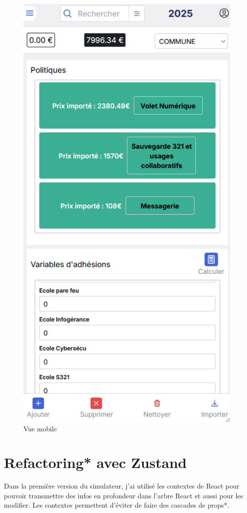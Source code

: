 \documentclass[a4paper,12pt]{report}
\begin{document}
\begin{figure}[H]
    \centering
    \includegraphics[scale=0.4]{vueMobile.png}
    \caption{Vue mobile}
    \label{fig:mobile-view}
\end{figure}


\section{Refactoring* avec Zustand}
Dans la première version du simulateur, j'ai utilisé les contextes de React pour pouvoir transmettre des infos en profondeur dans l'arbre React et aussi pour les modifier. Les contextes permettent d'éviter de faire des cascades de props*.
\end{document}
